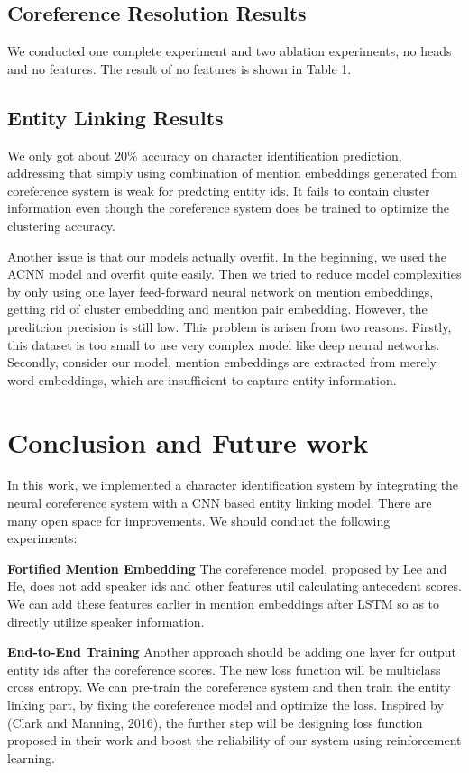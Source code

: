 \documentclass[11pt]{article}
\begin{document}
\subsection{Coreference Resolution Results}
We conducted one complete experiment and two ablation experiments, no heads and no features. The result of no features is shown in Table 1.



\subsection{Entity Linking Results}
We only got about 20\% accuracy on character identification prediction, addressing that simply using combination of mention embeddings generated from coreference system is weak for predcting entity ids. It fails to contain cluster information even though the coreference system does be trained to optimize the clustering accuracy. 

Another issue is that our models actually overfit. In the beginning, we used the ACNN model and overfit quite easily. Then we tried to reduce model complexities by only using one layer feed-forward neural network on mention embeddings, getting rid of cluster embedding and mention pair embedding. However, the preditcion precision is still low. This problem is arisen from two reasons. Firstly, this dataset is too small to use very complex model like deep neural networks. Secondly, consider our model, mention embeddings are extracted from merely word embeddings, which are insufficient to capture entity information.

\section{Conclusion and Future work}

In this work, we implemented a character identification system by integrating the neural coreference system with a CNN based entity linking model. There are many open space for improvements. We should conduct the following experiments:

{\bf Fortified Mention Embedding} 
The coreference model, proposed by Lee and He, does not add speaker ids and other features util calculating antecedent scores. We can add these features earlier in mention embeddings after LSTM so as to directly utilize speaker information.   

{\bf End-to-End Training}
Another approach should be adding one layer for output entity ids after the coreference scores. The new loss function will be multiclass cross entropy. We can pre-train the coreference system and then train the entity linking part, by fixing the coreference model and optimize the loss. Inspired by (Clark and Manning, 2016), the further step will be designing loss function proposed in their work and boost the reliability of our system using reinforcement learning.



%
%
\end{document}
